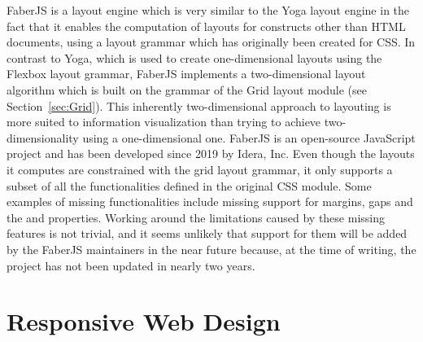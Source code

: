 FaberJS \parencite{FaberJS} is a layout engine which is very similar to the Yoga layout engine in the fact that it enables the computation of layouts for constructs other than HTML documents, using a layout grammar which has originally been created for CSS. 
In contrast to Yoga, which is used to create one-dimensional layouts using the Flexbox layout grammar, FaberJS implements a two-dimensional layout algorithm which is built on the grammar of the Grid layout module (see Section~\ref{sec:Grid}). 
This inherently two-dimensional approach to layouting is more suited to information visualization than trying to achieve two-dimensionality using a one-dimensional one. 
FaberJS is an open-source JavaScript project and has been developed since 2019 by Idera, Inc.
Even though the layouts it computes are constrained with the grid layout grammar, it only supports a subset of all the functionalities defined in the original CSS module. 
Some examples of missing functionalities include missing support for margins, gaps and the  and  properties. 
Working around the limitations caused by these missing features is not trivial, and it seems unlikely that support for them will be added by the FaberJS maintainers in the near future because, at the time of writing, the project has not been updated in nearly two years. 

\section{Responsive Web Design}
\label{sec:RWD}

